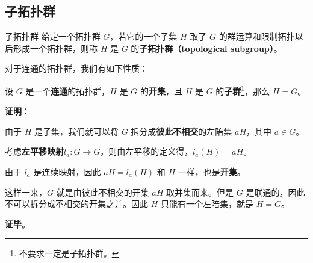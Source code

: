 
\subsection{子拓扑群}

\begin{definition}{子拓扑群}
给定一个拓扑群 $G$，若它的一个子集 $H$ 取了 $G$ 的群运算和限制拓扑以后形成一个拓扑群，则称 $H$ 是 $G$ 的\textbf{子拓扑群（topological subgroup）}。
\end{definition}

对于连通的拓扑群，我们有如下性质：

\begin{theorem}{}\label{the_TopGrp_1}
设 $G$ 是一个\textbf{连通}的拓扑群，$H$ 是 $G$ 的\textbf{开集}，且 $H$ 是 $G$ 的\textbf{子群}\footnote{不要求一定是子拓扑群。}，那么 $H=G$。
\end{theorem}

\textbf{证明}：

由于 $H$ 是子集，我们就可以将 $G$ 拆分成\textbf{彼此不相交}的左陪集 $aH$，其中 $a\in G$。

考虑\textbf{左平移映射}$l_a:G\to G$，则由左平移的定义得，$l_a(H)=aH$。

由于 $l_a$ 是连续映射，因此 $aH=l_a(H)$ 和 $H$ 一样，也是\textbf{开集}。

这样一来，$G$ 就是由彼此不相交的开集 $aH$ 取并集而来。但是 $G$ 是联通的，因此不可以拆分成不相交的开集之并。因此 $H$ 只能有一个左陪集，就是 $H=G$。

\textbf{证毕}。




